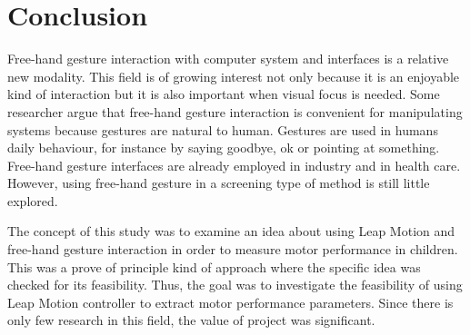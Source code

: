 \chapter{Conclusion}
\label{chap:conclusion}




Free-hand gesture interaction with computer system and interfaces is a relative new modality. This field is of growing interest not only because it is an enjoyable kind of interaction but it is also important when visual focus is needed. Some researcher argue that free-hand gesture interaction is convenient for manipulating systems because gestures are natural to human. Gestures are used in humans daily behaviour, for instance by saying goodbye, ok or pointing at something. 
Free-hand gesture interfaces are already employed in industry and in health care. However, using free-hand gesture in a screening type of method is still little explored.

The concept of this study was to examine an idea about using Leap Motion and free-hand gesture interaction in order to measure motor performance in children. This was a prove of principle kind of approach where the specific idea was checked for its feasibility. Thus, the goal was to investigate the feasibility of using Leap Motion controller to extract motor performance parameters. Since there is only few research in this field, the value of project was significant.

